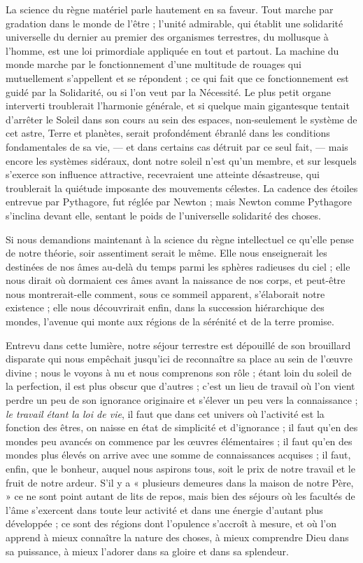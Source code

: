 \documentclass[a4paper, 11pt, oneside]{article}
\begin{document}
La science du règne matériel parle hautement en sa faveur. Tout marche par gradation dans le monde de l'être ; l'unité admirable, qui établit une solidarité universelle du dernier au premier des organismes terrestres, du mollusque à l'homme, est une loi primordiale appliquée en tout et partout. La machine du monde marche par le fonctionnement d'une multitude de rouages qui mutuellement s'appellent et se répondent ; ce qui fait que ce fonctionnement est guidé par la Solidarité, ou si l'on veut par la Nécessité. Le plus petit organe interverti troublerait l'harmonie générale, et si quelque main gigantesque tentait d'arrêter le Soleil dans son cours au sein des espaces, non-seulement le système de cet astre, Terre et planètes, serait profondément ébranlé dans les conditions fondamentales de sa vie, --- et dans certains cas détruit par ce seul fait, --- mais encore les systèmes sidéraux, dont notre soleil n'est qu'un membre, et sur lesquels s'exerce son influence attractive, recevraient une atteinte désastreuse, qui troublerait la quiétude imposante des mouvements célestes. La cadence des étoiles entrevue par Pythagore, fut réglée par Newton ; mais Newton comme Pythagore s'inclina devant elle, sentant le poids de l'universelle solidarité des choses.

Si nous demandions maintenant à la science du règne intellectuel ce qu'elle pense de notre théorie, soir assentiment serait le même. Elle nous enseignerait les destinées de nos âmes au-delà du temps parmi les sphères radieuses du ciel ; elle nous dirait où dormaient ces âmes avant la naissance de nos corps, et peut-être nous montrerait-elle comment, sous ce sommeil apparent, s'élaborait notre existence ; elle nous découvrirait enfin, dans la succession hiérarchique des mondes, l'avenue qui monte aux régions de la sérénité et de la terre promise.

Entrevu dans cette lumière, notre séjour terrestre est dépouillé de son brouillard disparate qui nous empêchait jusqu'ici de reconnaître sa place au sein de l'œuvre divine ; nous le voyons à nu et nous comprenons son rôle ; étant loin du soleil de la perfection, il est plus obscur que d'autres ; c'est un lieu de travail où l'on vient perdre un peu de son ignorance originaire et s'élever un peu vers la connaissance ; \emph{le travail étant la loi de vie}, il faut que dans cet univers où l'activité est la fonction des êtres, on naisse en état de simplicité et d'ignorance ; il faut qu'en des mondes peu avancés on commence par les œuvres élémentaires ; il faut qu'en des mondes plus élevés on arrive avec une somme de connaissances acquises ; il faut, enfin, que le bonheur, auquel nous aspirons tous, soit le prix de notre travail et le fruit de notre ardeur. S'il y a « plusieurs demeures dans la maison de notre Père, » ce ne sont point autant de lits de repos, mais bien des séjours où les facultés de l'âme s'exercent dans toute leur activité et dans une énergie d'autant plus développée ; ce sont des régions dont l'opulence s'accroît à mesure, et où l'on apprend à mieux connaître la nature des choses, à mieux comprendre Dieu dans sa puissance, à mieux l'adorer dans sa gloire et dans sa splendeur.
\end{document}
